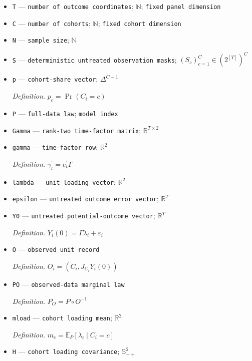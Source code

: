 \documentclass{article}
\begin{document}
\begin{itemize}
  \item \texttt{T} --- \texttt{number of outcome coordinates}; \(\mathbb N\); \texttt{fixed panel dimension}
  \item \texttt{C} --- \texttt{number of cohorts}; \(\mathbb N\); \texttt{fixed cohort dimension}
  \item \texttt{N} --- \texttt{sample size}; \(\mathbb N\)
  \item \texttt{S} --- \texttt{deterministic untreated observation masks}; \((S_c)_{c=1}^C\in(2^{[T]})^C\)
  \item \texttt{p} --- \texttt{cohort-\allowbreak{}share vector}; \(\Delta^{C-1}\)
  \par\smallskip\noindent\emph{Definition.} \(p_c=\Pr(C_i=c)\)
  \item \texttt{P} --- \texttt{full-\allowbreak{}data law}; \texttt{model index}
  \item \texttt{Gamma} --- \texttt{rank-\allowbreak{}two time-\allowbreak{}factor matrix}; \(\mathbb R^{T\times 2}\)
  \item \texttt{gamma} --- \texttt{time-\allowbreak{}factor row}; \(\mathbb R^2\)
  \par\smallskip\noindent\emph{Definition.} \(\gamma_t^{\prime}=e_t^{\prime}\Gamma\)
  \item \texttt{lambda} --- \texttt{unit loading vector}; \(\mathbb R^2\)
  \item \texttt{epsilon} --- \texttt{untreated outcome error vector}; \(\mathbb R^T\)
  \item \texttt{Y0} --- \texttt{untreated potential-\allowbreak{}outcome vector}; \(\mathbb R^T\)
  \par\smallskip\noindent\emph{Definition.} \(Y_i(0)=\Gamma\lambda_i+\varepsilon_i\)
  \item \texttt{O} --- \texttt{observed unit record}
  \par\smallskip\noindent\emph{Definition.} \(O_i=(C_i,J_{C_i}Y_i(0))\)
  \item \texttt{PO} --- \texttt{observed-\allowbreak{}data marginal law}
  \par\smallskip\noindent\emph{Definition.} \(P_O=P\circ O^{-1}\)
  \item \texttt{mload} --- \texttt{cohort loading mean}; \(\mathbb R^2\)
  \par\smallskip\noindent\emph{Definition.} \(m_c=\mathbb E_P[\lambda_i\mid C_i=c]\)
  \item \texttt{H} --- \texttt{cohort loading covariance}; \(\mathbb S_{++}^2\)

\end{itemize}
\end{document}
